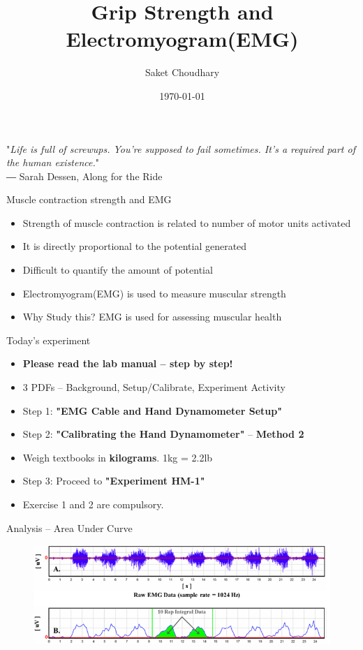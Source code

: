 \documentclass[10pt]{beamer}
\title{Grip Strength and Electromyogram(EMG)}
\date{\today}
\author{Saket Choudhary}
\institute{BISC 104\\Session 4}
\begin{document}
\maketitle

\begin{frame}[standout]
  "\textit{Life is full of screwups. You're supposed to fail sometimes. It's a required part of the human existence.}"\\
\hfill ― Sarah Dessen, Along for the Ride
\end{frame}

\begin{frame}[fragile]{Muscle contraction strength and EMG}
\begin{itemize}[<+-| alert@+>]
\item Strength of muscle contraction is related to number of motor units activated
\item It is directly proportional to the potential generated
\item Difficult to quantify the amount of potential
\item Electromyogram(EMG) is used to measure muscular strength
\item Why Study this? EMG is used for assessing muscular health
\end{itemize}
\end{frame}

\begin{frame}[fragile]{Today's experiment}
\begin{itemize}[<+-| alert@+>]
\item \textbf{Please read the lab manual -- step by step!}
\item 3 PDFs -- Background, Setup/Calibrate, Experiment Activity
\item Step 1: \textbf{"EMG Cable and Hand Dynamometer Setup"}
\item Step 2: \textbf{"Calibrating the Hand Dynamometer"} -- \textbf{Method 2}
\item Weigh textbooks in \textbf{kilograms}. 1kg = 2.2lb
\item Step 3: Proceed to \textbf{"Experiment HM-1"}
\item Exercise 1 and 2 are compulsory.
\end{itemize}
\end{frame}

\begin{frame}[fragile]{Analysis -- Area Under Curve}
\begin{figure}
\includegraphics[width=\linewidth]{emg}
\end{figure}
\end{frame}
\end{document}
